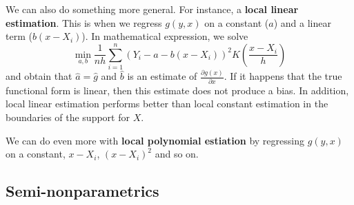 \documentclass[12pt]{article}
\theoremstyle{definition}
\theoremstyle{property}
\theoremstyle{assumption}
\theoremstyle{example}
\theoremstyle{comment}
\begin{document}
 We can also do something more general. For instance, a \textbf{local linear estimation}. This is when we regress $g(y,x)$ on a constant ($a$) and a linear term ($b(x-X_i)$). In mathematical expression, we solve
 \[
 \min_{a,b}\frac{1}{nh}\sum_{i=1}^n(Y_i-a-b(x-X_i))^2K\left(\frac{x-X_i}{h}\right)
 \]
 and obtain that $\hat{a}=\hat{g}$ and $\hat{b}$ is an estimate of $\frac{\partial g(x)}{\partial x}$. If it happens that the true functional form is linear, then this estimate does not produce a bias. In addition, local linear estimation performs better than local constant estimation in the boundaries of the support for $X$. \par
 We can do even more with \textbf{local polynomial estiation} by regressing $g(y,x)$ on a constant, $x-X_i$, $(x-X_i)^2$ and so on. 
 \subsection{Semi-nonparametrics}
\end{document}
